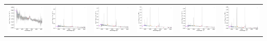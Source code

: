 \begin{center}
\begin{longtable}{l l l l l l }
    \includegraphics[width=0.3\linewidth, clip]{Figs/Figs-sdss/spec-0377-52145-0484-STRIPE82-0142-017985.pdf} & \includegraphics[width=0.3\linewidth, clip]{Figs/Figs-sdss/spec-0378-52146-0223-STRIPE82-0145-047131.pdf} & \includegraphics[width=0.3\linewidth, clip]{Figs/Figs-sdss/spec-0389-51795-0544-STRIPE82-0008-021736.pdf} & \includegraphics[width=0.3\linewidth, clip]{Figs/Figs-sdss/spec-0390-51900-0596-STRIPE82-0010-026778.pdf} & \includegraphics[width=0.3\linewidth, clip]{Figs/Figs-sdss/spec-0391-51782-0125-STRIPE82-0011-016278.pdf} & \includegraphics[width=0.3\linewidth, clip]{Figs/Figs-sdss/spec-0391-51782-0394-STRIPE82-0010-016724.pdf} \\

\end{longtable}
\end{center}
